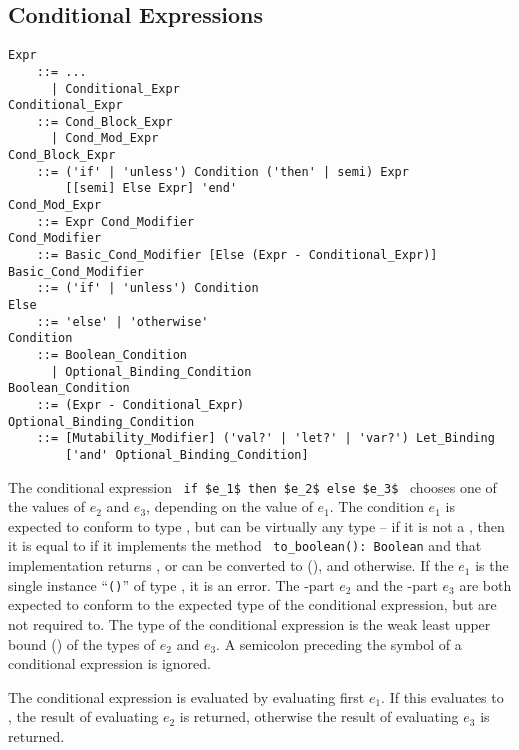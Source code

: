 \subsection{Conditional Expressions}
\label{sec:conditional-expressions}
\grammar\begin{lstlisting}
Expr
    ::= ...
      | Conditional_Expr
Conditional_Expr
    ::= Cond_Block_Expr 
      | Cond_Mod_Expr
Cond_Block_Expr 
    ::= ('if' | 'unless') Condition ('then' | semi) Expr
        [[semi] Else Expr] 'end'
Cond_Mod_Expr
    ::= Expr Cond_Modifier
Cond_Modifier 
    ::= Basic_Cond_Modifier [Else (Expr - Conditional_Expr)]
Basic_Cond_Modifier
    ::= ('if' | 'unless') Condition 
Else 
    ::= 'else' | 'otherwise'
Condition 
    ::= Boolean_Condition 
      | Optional_Binding_Condition
Boolean_Condition 
    ::= (Expr - Conditional_Expr) 
Optional_Binding_Condition 
    ::= [Mutability_Modifier] ('val?' | 'let?' | 'var?') Let_Binding 
        ['and' Optional_Binding_Condition]
\end{lstlisting}

The conditional expression ~\lstinline!if $e_1$ then $e_2$ else $e_3$!~ chooses one of the values of $e_2$ and $e_3$, depending on the value of $e_1$. The condition $e_1$ is expected to conform to type , but can be virtually any type -- if it is not a , then it is equal to  if it implements the method ~\lstinline!to_boolean(): Boolean! and that implementation returns , or can be converted to  (), and  otherwise. If the $e_1$ is the single instance ``\lstinline!()!'' of type , it is an error. The -part $e_2$ and the -part $e_3$ are both expected to conform to the expected type of the conditional expression, but are not required to. The type of the conditional expression is the weak least upper bound () of the types of $e_2$ and $e_3$. A semicolon preceding the  symbol of a conditional expression is ignored. 

The conditional expression is evaluated by evaluating first $e_1$. If this evaluates to , the result of evaluating $e_2$ is returned, otherwise the result of evaluating $e_3$ is returned. 


